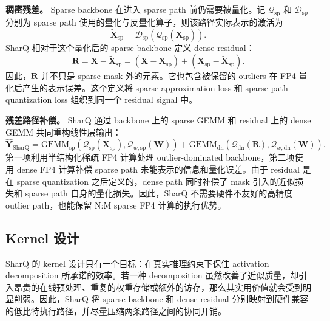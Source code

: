 \documentclass{article}
\begin{document}
\textbf{稠密残差。}
Sparse backbone 在进入 sparse path 前仍需要被量化。记
$\mathcal{Q}_{\mathrm{sp}}$ 和 $\mathcal{D}_{\mathrm{sp}}$ 分别为 sparse path 使用的量化与反量化算子，则该路径实际表示的激活为
\begin{equation}
  \widetilde{\mathbf{X}}_{\mathrm{sp}}
  =
  \mathcal{D}_{\mathrm{sp}}
  \left(
    \mathcal{Q}_{\mathrm{sp}}(\mathbf{X}_{\mathrm{sp}})
  \right).
  \label{eq:sharq-quantized-backbone}
\end{equation}
SharQ 相对于这个量化后的 sparse backbone 定义 dense residual：
\begin{equation}
  \mathbf{R}
  =
  \mathbf{X} - \widetilde{\mathbf{X}}_{\mathrm{sp}}
  =
  (\mathbf{X} - \mathbf{X}_{\mathrm{sp}})
  +
  (\mathbf{X}_{\mathrm{sp}} - \widetilde{\mathbf{X}}_{\mathrm{sp}}).
  \label{eq:sharq-residual}
\end{equation}
因此，$\mathbf{R}$ 并不只是 sparse mask 外的元素。它也包含被保留的
outliers 在 FP4 量化后产生的表示误差。这个定义将 sparse approximation loss
和 sparse-path quantization loss 组织到同一个 residual signal 中。

\textbf{残差路径补偿。}
SharQ 通过 backbone 上的 sparse GEMM 和 residual 上的 dense GEMM 共同重构线性层输出：
\begin{equation}
  \widehat{\mathbf{Y}}_{\mathrm{SharQ}}
  =
  \mathrm{GEMM}_{\mathrm{sp}}
  \left(
    \mathcal{Q}_{\mathrm{sp}}(\mathbf{X}_{\mathrm{sp}}),
    \mathcal{Q}_{w,\mathrm{sp}}(\mathbf{W})
  \right)
  +
  \mathrm{GEMM}_{\mathrm{dn}}
  \left(
    \mathcal{Q}_{\mathrm{dn}}(\mathbf{R}),
    \mathcal{Q}_{w,\mathrm{dn}}(\mathbf{W})
  \right).
  \label{eq:sharq-output}
\end{equation}
第一项利用半结构化稀疏 FP4 计算处理 outlier-dominated backbone，第二项使用 dense
FP4 计算补偿 sparse path 未能表示的信息和量化误差。由于 residual 是在 sparse
quantization 之后定义的，dense path 同时补偿了 mask 引入的近似损失和 sparse path
自身的量化损失。因此，SharQ 不需要硬件不友好的高精度 outlier path，也能保留
N:M sparse FP4 计算的执行优势。

\subsection{Kernel 设计}

SharQ 的 kernel 设计只有一个目标：在真实推理约束下保住 activation decomposition
所承诺的效率。若一种 decomposition 虽然改善了近似质量，却引入昂贵的在线预处理、重复的权重存储或额外的访存，那么其实用价值就会受到明显削弱。因此，SharQ 将 sparse
backbone 和 dense residual 分别映射到硬件兼容的低比特执行路径，并尽量压缩两条路径之间的协同开销。
\end{document}
